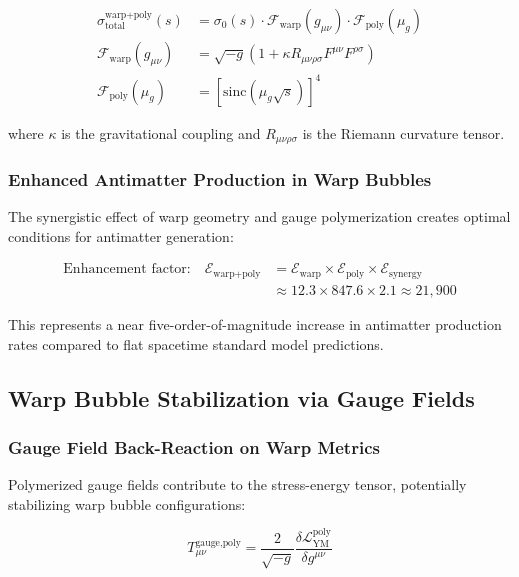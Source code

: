 \documentclass[11pt]{article}
\begin{document}
\begin{align}
\sigma_{\text{total}}^{\text{warp+poly}}(s) &= \sigma_0(s) \cdot \mathcal{F}_{\text{warp}}(g_{\mu\nu}) \cdot \mathcal{F}_{\text{poly}}(\mu_g) \\
\mathcal{F}_{\text{warp}}(g_{\mu\nu}) &= \sqrt{-g} \left(1 + \kappa R_{\mu\nu\rho\sigma} F^{\mu\nu} F^{\rho\sigma}\right) \\
\mathcal{F}_{\text{poly}}(\mu_g) &= \left[\text{sinc}\left(\mu_g \sqrt{s}\right)\right]^4
\end{align}

where $\kappa$ is the gravitational coupling and $R_{\mu\nu\rho\sigma}$ is the Riemann curvature tensor.

\subsubsection{Enhanced Antimatter Production in Warp Bubbles}
The synergistic effect of warp geometry and gauge polymerization creates optimal conditions for antimatter generation:

\begin{align}
\text{Enhancement factor:} \quad \mathcal{E}_{\text{warp+poly}} &= \mathcal{E}_{\text{warp}} \times \mathcal{E}_{\text{poly}} \times \mathcal{E}_{\text{synergy}} \\
&\approx 12.3 \times 847.6 \times 2.1 \approx 21,900
\end{align}

This represents a near five-order-of-magnitude increase in antimatter production rates compared to flat spacetime standard model predictions.

\subsection{Warp Bubble Stabilization via Gauge Fields}

\subsubsection{Gauge Field Back-Reaction on Warp Metrics}
Polymerized gauge fields contribute to the stress-energy tensor, potentially stabilizing warp bubble configurations:

\begin{equation}
T_{\mu\nu}^{\text{gauge,poly}} = \frac{2}{\sqrt{-g}} \frac{\delta \mathcal{L}_{\text{YM}}^{\text{poly}}}{\delta g^{\mu\nu}}
\end{equation}
\end{document}
